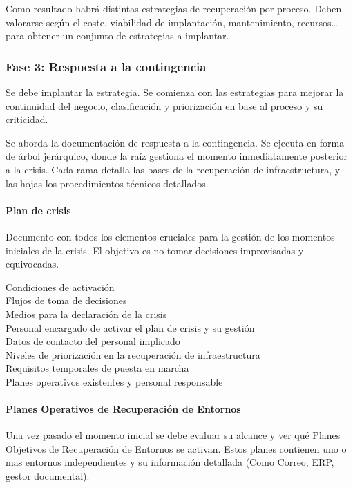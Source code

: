         Como resultado habrá distintas estrategias de recuperación por proceso. Deben valorarse según el coste, viabilidad de implantación, mantenimiento, recursos\dots para obtener un conjunto de estrategias a implantar.

    \subsubsection{Fase 3: Respuesta a la contingencia} %
        Se debe implantar la estrategia. Se comienza con las estrategias para mejorar la continuidad del negocio, clasificación y priorización en base al proceso y su criticidad.

        Se aborda la documentación de respuesta a la contingencia. Se ejecuta en forma de árbol jerárquico, donde la raíz gestiona el momento inmediatamente posterior a la crisis. Cada rama detalla las bases de la recuperación de infraestructura, y las hojas los procedimientos técnicos detallados.

        \paragraph{Plan de crisis}
            Documento con todos los elementos cruciales para la gestión de los momentos iniciales de la crisis. El objetivo es no tomar decisiones improvisadas y equivocadas.

            \begin{description}
                \item[Condiciones de activación]
                \item[Flujos de toma de decisiones]
                \item[Medios para la declaración de la crisis]
                \item[Personal encargado de activar el plan de crisis y su gestión]
                \item[Datos de contacto del personal implicado]
                \item[Niveles de priorización en la recuperación de infraestructura]
                \item[Requisitos temporales de puesta en marcha]
                \item[Planes operativos existentes y personal responsable]
            \end{description}

        \paragraph{Planes Operativos de Recuperación de Entornos}
            Una vez pasado el momento inicial se debe evaluar su alcance y ver qué Planes Objetivos de Recuperación de Entornos se activan. Estos planes contienen uno o mas entornos independientes y su información detallada (Como Correo, ERP, gestor documental).

